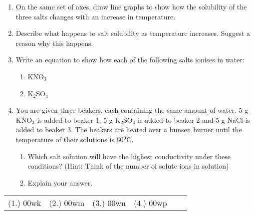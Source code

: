 {\begin{enumerate}
\item{On the same set of axes, draw line graphs to show how the solubility of the three salts changes with an increase in temperature.}
\item{Describe what happens to salt solubility as temperature increases. Suggest a reason why this happens.}
\item{Write an equation to show how each of the following salts ionises in water:}
\begin{enumerate}
\item{KNO$_{3}$}
\item{K$_{2}$SO$_{4}$}
\end{enumerate}
\item{You are given three beakers, each containing the same amount of water. 5 g KNO$_{3}$ is added to beaker 1, 5 g K$_{2}$SO$_{4}$ is added to beaker 2 and 5 g NaCl is added to beaker 3. The beakers are heated over a bunsen burner until the temperature of their solutions is 60$^{0}$C.}
\begin{enumerate}
\item{Which salt solution will have the highest conductivity under these conditions? (Hint: Think of the number of solute ions in solution) }
\item{Explain your answer.}
\end{enumerate}
\end{enumerate}
\practiceinfo

\begin{tabular}[h]{cccccc}
(1.) 00wk & (2.) 00wm & (3.) 00wn & (4.) 00wp & 
 \end{tabular}
}

